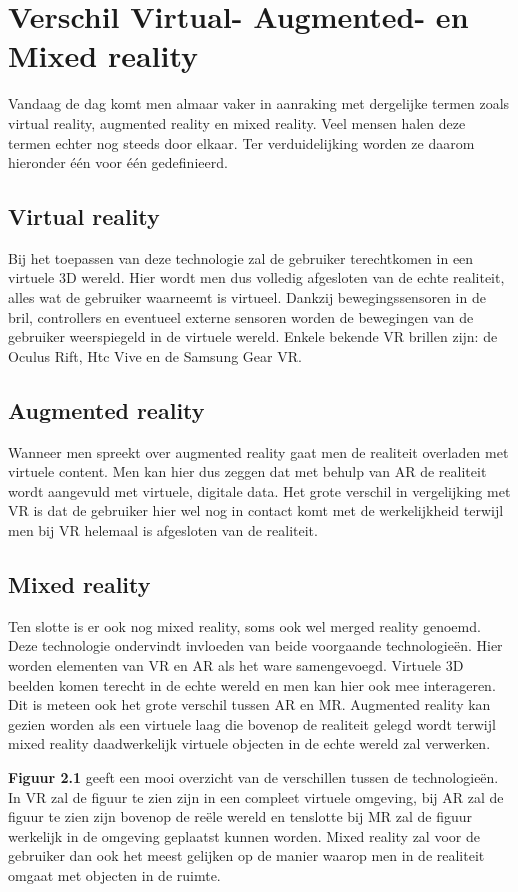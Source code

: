 \section{Verschil Virtual- Augmented- en Mixed reality}
Vandaag de dag komt men almaar vaker in aanraking met dergelijke termen zoals virtual reality, augmented reality en mixed reality. Veel mensen halen deze termen echter nog steeds door elkaar. Ter verduidelijking worden ze daarom hieronder één voor één gedefinieerd. 

\subsection{Virtual reality}
Bij het toepassen van deze technologie zal de gebruiker terechtkomen in een virtuele 3D wereld. Hier wordt men dus volledig afgesloten van de echte realiteit, alles wat de gebruiker waarneemt is virtueel. Dankzij bewegingssensoren in de bril, controllers en eventueel externe sensoren worden de bewegingen van de gebruiker weerspiegeld in de virtuele wereld. Enkele bekende VR brillen zijn: de Oculus Rift, Htc Vive en de Samsung Gear VR.

\subsection{Augmented reality}
Wanneer men spreekt over augmented reality gaat men de realiteit overladen met virtuele content. Men kan hier dus zeggen dat met behulp van AR de realiteit wordt aangevuld met virtuele, digitale data. Het grote verschil in vergelijking met VR is dat de gebruiker hier wel nog in contact komt met de werkelijkheid terwijl men bij VR helemaal is afgesloten van de realiteit.

\subsection{Mixed reality}
Ten slotte is er ook nog mixed reality, soms ook wel merged reality genoemd. Deze technologie ondervindt invloeden van beide voorgaande technologieën. Hier worden elementen van VR en AR als het ware samengevoegd. Virtuele 3D beelden komen terecht in de echte wereld en men kan hier ook mee interageren. Dit is meteen ook het grote verschil tussen AR en MR. Augmented reality kan gezien worden als een virtuele laag die bovenop de realiteit gelegd wordt terwijl mixed reality daadwerkelijk virtuele objecten in de echte wereld zal verwerken. 

\textbf{Figuur 2.1} geeft een mooi overzicht van de verschillen tussen de technologieën. In VR zal de figuur te zien zijn in een compleet virtuele omgeving, bij AR zal de figuur te zien zijn bovenop de reële wereld en tenslotte bij MR zal de figuur werkelijk in de omgeving geplaatst kunnen worden. Mixed reality zal voor de gebruiker dan ook het meest gelijken op de manier waarop men in de realiteit omgaat met objecten in de ruimte.

